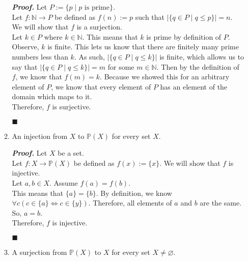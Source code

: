 \documentclass[11pt,a4paper]{article}
\begin{document}
\begin{enumerate}
\begin{enumerate}
        \emph{\textbf{Proof.}} Let $P := \{p \mid p \text{ is prime} \} $. \\
        Let $f: \mathbb{N} \rightarrow P $ be defined as $f(n) := p$ such that $|\{q \in P \mid q \leq p \}| = n$. We will show that $f$ is a surjection. \\
        Let $k \in P $ where $k \in \mathbb{N} $. This means that $k$ is prime by definition of $P$. Observe, $k$ is finite. This lets us know that there are finitely many prime numbers less than $k$. As such, $|\{q \in P \mid q \leq k\}| $ is finite, which allows us to say that $|\{q \in P \mid q \leq k \}| = m $ for some $m \in \mathbb{N} $.
        Then by the definition of $f$, we know that $f(m) = k $. Because we showed this for an arbitrary element of $P$, we know that every element of $P$ has an element of the domain which maps to it. \\
        Therefore, $f$ is surjective.
        \begin{flushright}
            $\blacksquare$
        \end{flushright}    

        \item 
        An injection from $X$ to $\mathbb{P}(X) $ for every set $X$. 

        \emph{\textbf{Proof.}} Let $X$ be a set. \\
        Let $f: X \rightarrow \mathbb{P}(X) $ be defined as  $f(x) := \{x\} $. We will show that $f$ is injective. \\
        Let $a, b \in X$. Assume $f(a) = f(b)$. \\
        This means that $\{a\} = \{b\} $. By definition, we know $\forall c (c \in \{a\} \Longleftrightarrow c \in \{y\}) $. Therefore, all elements of $a$ and $b$ are the same. So, $a = b$.  \\
        Therefore, $f$ is injective.  
        \begin{flushright}
            $\blacksquare$
        \end{flushright}    
        
        \item 
        A surjection from $\mathbb{P}(X) $ to $X$ for every set $X \neq \varnothing $.   


\end{enumerate}
\end{enumerate}
\end{document}
